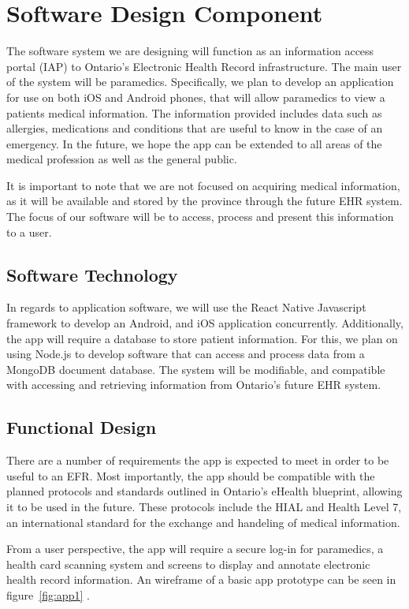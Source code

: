 
\section{Software Design Component}

The software system we are designing will function as an information access portal (IAP) to Ontario's Electronic Health Record infrastructure. The main user of the system will be paramedics. Specifically, we plan to develop an application for use on both iOS and Android phones, that will allow paramedics to view a patients medical information. The information provided includes data such as allergies, medications and conditions that are useful to know in the case of an emergency. In the future, we hope the app can be extended to all areas of the medical profession as well as the general public.

It is important to note that we are not focused on acquiring medical information, as it will be available and stored by the province through the future EHR system. The focus of our software will be to access, process and present this information to a user.

\subsection{Software Technology}
In regards to application software, we will use the React Native Javascript framework to develop an Android, and iOS application concurrently. Additionally, the app will require a database to store patient information. For this, we plan on using Node.js to develop software that can access and process data from a MongoDB document database. The system will be modifiable, and compatible with accessing and retrieving information from Ontario's future EHR system.

\subsection{Functional Design}

There are a number of requirements the app is expected to meet in order to be useful to an EFR. Most importantly, the app should be compatible with the planned protocols and standards outlined in Ontario's eHealth blueprint, allowing it to be used in the future. These protocols include the HIAL and Health Level 7, an international standard for the exchange and handeling of medical information.

From a user perspective, the app will require a secure log-in for paramedics, a health card scanning system and screens to display and annotate electronic health record information. An wireframe of a basic app prototype can be seen in figure~\ref{fig:app1} .


